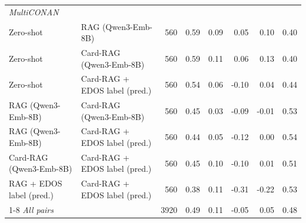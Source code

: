 \begin{table}[t]
{\begin{tabular}{llrrrrrr}
\midrule
\multicolumn{8}{l}{\textit{MultiCONAN}} \\
Zero-shot & RAG (Qwen3-Emb-8B) & 560 & 0.59 & 0.09 & 0.05 & 0.10 & 0.40 \\
Zero-shot & Card-RAG (Qwen3-Emb-8B) & 560 & 0.59 & 0.11 & 0.06 & 0.13 & 0.40 \\
Zero-shot & Card-RAG + EDOS label (pred.) & 560 & 0.54 & 0.06 & -0.10 & 0.04 & 0.44 \\
RAG (Qwen3-Emb-8B) & Card-RAG (Qwen3-Emb-8B) & 560 & 0.45 & 0.03 & -0.09 & -0.01 & 0.53 \\
RAG (Qwen3-Emb-8B) & Card-RAG + EDOS label (pred.) & 560 & 0.44 & 0.05 & -0.12 & 0.00 & 0.54 \\
Card-RAG (Qwen3-Emb-8B) & Card-RAG + EDOS label (pred.) & 560 & 0.45 & 0.10 & -0.10 & 0.01 & 0.51 \\
RAG + EDOS label (pred.) & Card-RAG + EDOS label (pred.) & 560 & 0.38 & 0.11 & -0.31 & -0.22 & 0.53 \\
\cmidrule(lr){1-8}
\textit{All pairs} &  & 3920 & 0.49 & 0.11 & -0.05 & 0.05 & 0.48 \\
\bottomrule
\end{tabular}%
}
\end{table}
